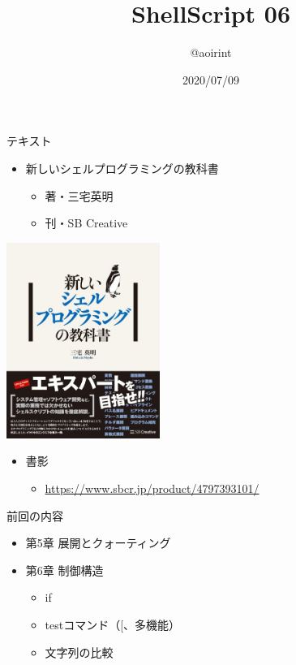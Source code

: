\documentclass[12pt,aspectratio=169]{beamer}
\title{ShellScript 06}
\author{@aoirint}
\date{2020/07/09}
\begin{document}
\frame{\maketitle}

\begin{frame}{テキスト}

  \begin{minipage}{0.58\textwidth}
    \begin{itemize}
      \item 新しいシェルプログラミングの教科書
      \begin{itemize}
        \item 著・三宅英明
        \item 刊・SB Creative
      \end{itemize}
    \end{itemize}
  \end{minipage}
  \hfill
  \begin{minipage}{0.38\textwidth}
    \vspace{-4\baselineskip}
    \begin{center}
      \includegraphics[width=5cm,bb=0 0 467 596]{../01/images/shellbook.jpg}
    \end{center}
  \end{minipage}

  \begin{itemize}
    \item 書影
    \begin{itemize}
      \item { \small \url{https://www.sbcr.jp/product/4797393101/} }
    \end{itemize}
  \end{itemize}

\end{frame}


\begin{frame}{前回の内容}

  \begin{itemize}
    \item 第5章 展開とクォーティング
    \item 第6章 制御構造
    \begin{itemize}
      \item if
      \item testコマンド（[、多機能）
      \item 文字列の比較
    \end{itemize}
  \end{itemize}

\end{frame}
\end{document}
